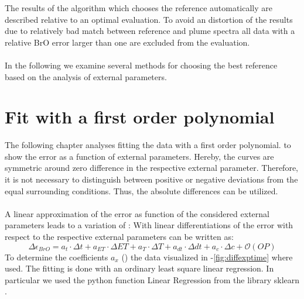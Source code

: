 \documentclass  [
  paper    = a4,
  BCOR     = 10mm,
  twoside,
  fontsize = 12pt,
  fleqn,
  toc      = bibnumbered,
  toc      = listofnumbered,
  numbers  = noendperiod,
  headings = normal,
  listof   = leveldown,
  version  = 3.03
]                                       {scrreprt}
\begin{document}
	The results of the algorithm which chooses the reference automatically are described relative to an optimal evaluation. To avoid an 	    distortion of the results due to relatively bad match between reference and plume spectra all data with a relative BrO error larger          than one are excluded from the evaluation.\\
	\\
	In the following we examine several methods for choosing the best reference based on the analysis of external parameters. 
	
	\section{Fit with a first order polynomial}
	The following chapter analyses fitting the data with a first order polynomial.  to  show the   error as a function of external parameters. Hereby, the curves are symmetric around zero difference in the respective external parameter. Therefore, it is not necessary to distinguish between positive or negative deviations from the equal surrounding conditions. Thus, the absolute differences can be utilized.\\
	\\
	A linear approximation of the   error as function of the considered external parameters leads to a variation of   :
	With linear differentiations of the   error with respect to the respective external parameters  can be written as:	
	\begin{equation}
		\Delta \epsilon_{BrO} = a_{t}\cdot\Delta t+a_{ET}\cdot\Delta ET+a_{T}\cdot\Delta T+a_{dt}\cdot\Delta dt +a_{c}\cdot\Delta c + \mathcal{O}\left(OP\right)
		\label{calc:delterr}
	\end{equation}
	To determine the coefficients $a_{x}$ () the data visualized in -\ref{fig:diffexptime} where used.  The fitting is done with an ordinary least square linear regression. In particular we used the python function Linear Regression from the library sklearn \citep{SKlearn}. \\
	
\end{document}
